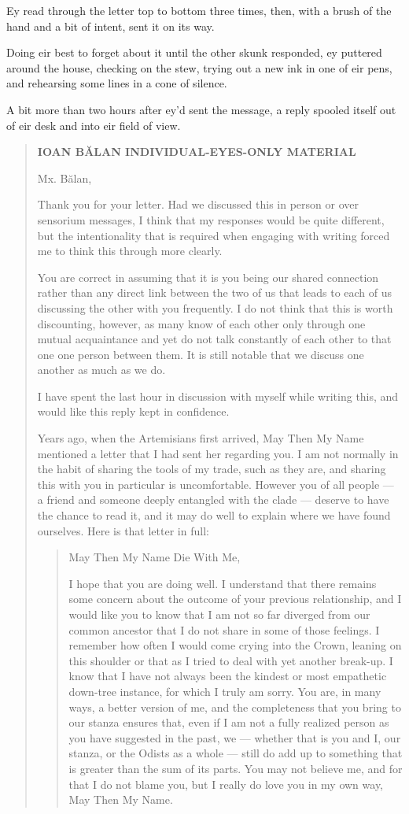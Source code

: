 Ey read through the letter top to bottom three times, then, with a brush of the hand and a bit of intent, sent it on its way.

Doing eir best to forget about it until the other skunk responded, ey puttered around the house, checking on the stew, trying out a new ink in one of eir pens, and rehearsing some lines in a cone of silence.

A bit more than two hours after ey'd sent the message, a reply spooled itself out of eir desk and into eir field of view.

\begin{quote}
\textbf{IOAN BĂLAN INDIVIDUAL-EYES-ONLY MATERIAL}

Mx. Bălan,

Thank you for your letter. Had we discussed this in person or over sensorium messages, I think that my responses would be quite different, but the intentionality that is required when engaging with writing forced me to think this through more clearly.

You are correct in assuming that it is you being our shared connection rather than any direct link between the two of us that leads to each of us discussing the other with you frequently. I do not think that this is worth discounting, however, as many know of each other only through one mutual acquaintance and yet do not talk constantly of each other to that one one person between them. It is still notable that we discuss one another as much as we do.

I have spent the last hour in discussion with myself while writing this, and would like this reply kept in confidence.

Years ago, when the Artemisians first arrived, May Then My Name mentioned a letter that I had sent her regarding you. I am not normally in the habit of sharing the tools of my trade, such as they are, and sharing this with you in particular is uncomfortable. However you of all people — a friend and someone deeply entangled with the clade — deserve to have the chance to read it, and it may do well to explain where we have found ourselves. Here is that letter in full:

\begin{quote}
May Then My Name Die With Me,

I hope that you are doing well. I understand that there remains some concern about the outcome of your previous relationship, and I would like you to know that I am not so far diverged from our common ancestor that I do not share in some of those feelings. I remember how often I would come crying into the Crown, leaning on this shoulder or that as I tried to deal with yet another break-up. I know that I have not always been the kindest or most empathetic down-tree instance, for which I truly am sorry. You are, in many ways, a better version of me, and the completeness that you bring to our stanza ensures that, even if I am not a fully realized person as you have suggested in the past, we — whether that is you and I, our stanza, or the Odists as a whole — still do add up to something that is greater than the sum of its parts. You may not believe me, and for that I do not blame you, but I really do love you in my own way, May Then My Name.


\end{quote}
\end{quote}
